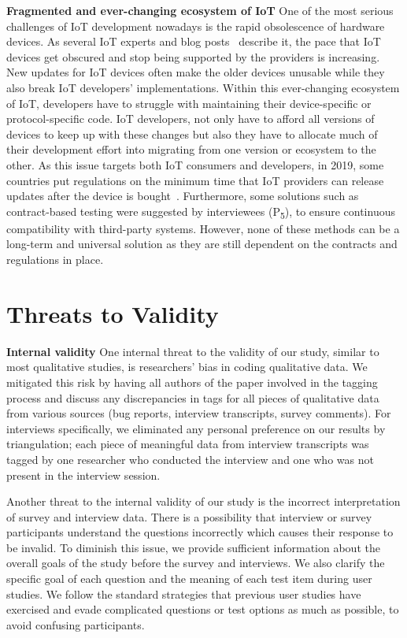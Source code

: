 {\textbf{Fragmented and ever-changing ecosystem of IoT}
One of the most serious challenges of IoT development nowadays is the rapid obsolescence of hardware devices. As several IoT experts and blog posts~\cite{gizmodoblogpost,iotforallblogpost} describe it, the pace that IoT devices get obscured and stop being supported by the providers is increasing. New updates for IoT devices often make the older devices unusable while they also break IoT developers' implementations. Within this ever-changing ecosystem of IoT, developers have to struggle with maintaining their device-specific or protocol-specific code. IoT developers, not only have to afford all versions of devices to keep up with these changes but also they have to allocate much of their development effort into migrating from one version or ecosystem to the other. As this issue targets both IoT consumers and developers, in 2019, some countries put regulations on the minimum time that IoT providers can release updates after the device is bought~\cite{UKregulations}. Furthermore, some solutions such as contract-based testing were suggested by interviewees (P\textsubscript{5}), to ensure continuous compatibility with third-party systems. However, none of these methods can be a long-term and universal solution as they are still dependent on the contracts and regulations in place.

\section{Threats to Validity}
\textbf{Internal validity}
One internal threat to the validity of our study, similar to most qualitative studies, is researchers' bias in coding qualitative data. We mitigated this risk by having all authors of the paper involved in the tagging process and discuss any discrepancies in tags for all pieces of qualitative data from various sources (bug reports, interview transcripts, survey comments). For interviews specifically, we eliminated any personal preference on our results by triangulation; each piece of meaningful data from interview transcripts was tagged by one researcher who conducted the interview and one who was not present in the interview session.

Another threat to the internal validity of our study is the incorrect interpretation of survey and interview data. There is a possibility that interview or survey participants understand the questions incorrectly which causes their response to be invalid. To diminish this issue, we provide sufficient information about the overall goals of the study before the survey and interviews. We also clarify the specific goal of each question and the meaning of each test item during user studies. We follow the standard strategies that previous user studies have exercised and evade complicated questions or test options as much as possible, to avoid confusing participants.

}
